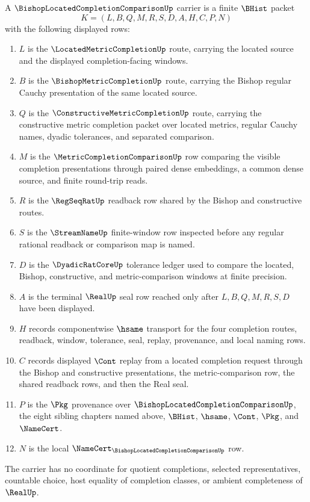 \begin{definition}
\label{def:bishop-located-completion-comparison-carrier}
A $\BishopLocatedCompletionComparisonUp$ carrier is a finite $\BHist$ packet
$$
K=(L,B,Q,M,R,S,D,A,H,C,P,N)
$$
with the following displayed rows:
\begin{enumerate}
\item $L$ is the $\LocatedMetricCompletionUp$ route, carrying the located source and the displayed completion-facing windows.
\item $B$ is the $\BishopMetricCompletionUp$ route, carrying the Bishop regular Cauchy presentation of the same located source.
\item $Q$ is the $\ConstructiveMetricCompletionUp$ route, carrying the constructive metric completion packet over located metrics, regular Cauchy names, dyadic tolerances, and separated comparison.
\item $M$ is the $\MetricCompletionComparisonUp$ row comparing the visible completion presentations through paired dense embeddings, a common dense source, and finite round-trip reads.
\item $R$ is the $\RegSeqRatUp$ readback row shared by the Bishop and constructive routes.
\item $S$ is the $\StreamNameUp$ finite-window row inspected before any regular rational readback or comparison map is named.
\item $D$ is the $\DyadicRatCoreUp$ tolerance ledger used to compare the located, Bishop, constructive, and metric-comparison windows at finite precision.
\item $A$ is the terminal $\RealUp$ seal row reached only after $L,B,Q,M,R,S,D$ have been displayed.
\item $H$ records componentwise $\hsame$ transport for the four completion routes, readback, window, tolerance, seal, replay, provenance, and local naming rows.
\item $C$ records displayed $\Cont$ replay from a located completion request through the Bishop and constructive presentations, the metric-comparison row, the shared readback rows, and then the Real seal.
\item $P$ is the $\Pkg$ provenance over $\BishopLocatedCompletionComparisonUp$, the eight sibling chapters named above, $\BHist$, $\hsame$, $\Cont$, $\Pkg$, and $\NameCert$.
\item $N$ is the local $\NameCert_{\BishopLocatedCompletionComparisonUp}$ row.
\end{enumerate}
The carrier has no coordinate for quotient completions, selected representatives, countable choice, host equality of completion classes, or ambient completeness of $\RealUp$.
\end{definition}

